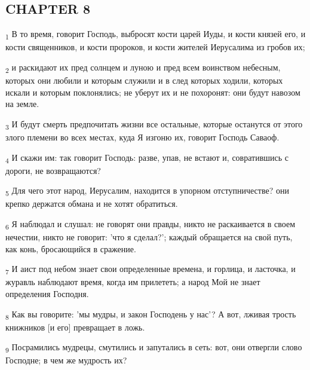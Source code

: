 \subsection{CHAPTER 8}
\begin{tcolorbox}
\textsubscript{1} В то время, говорит Господь, выбросят кости царей Иуды, и кости князей его, и кости священников, и кости пророков, и кости жителей Иерусалима из гробов их;
\end{tcolorbox}
\begin{tcolorbox}
\textsubscript{2} и раскидают их пред солнцем и луною и пред всем воинством небесным, которых они любили и которым служили и в след которых ходили, которых искали и которым поклонялись; не уберут их и не похоронят: они будут навозом на земле.
\end{tcolorbox}
\begin{tcolorbox}
\textsubscript{3} И будут смерть предпочитать жизни все остальные, которые останутся от этого злого племени во всех местах, куда Я изгоню их, говорит Господь Саваоф.
\end{tcolorbox}
\begin{tcolorbox}
\textsubscript{4} И скажи им: так говорит Господь: разве, упав, не встают и, совратившись с дороги, не возвращаются?
\end{tcolorbox}
\begin{tcolorbox}
\textsubscript{5} Для чего этот народ, Иерусалим, находится в упорном отступничестве? они крепко держатся обмана и не хотят обратиться.
\end{tcolorbox}
\begin{tcolorbox}
\textsubscript{6} Я наблюдал и слушал: не говорят они правды, никто не раскаивается в своем нечестии, никто не говорит: 'что я сделал?'; каждый обращается на свой путь, как конь, бросающийся в сражение.
\end{tcolorbox}
\begin{tcolorbox}
\textsubscript{7} И аист под небом знает свои определенные времена, и горлица, и ласточка, и журавль наблюдают время, когда им прилететь; а народ Мой не знает определения Господня.
\end{tcolorbox}
\begin{tcolorbox}
\textsubscript{8} Как вы говорите: 'мы мудры, и закон Господень у нас'? А вот, лживая трость книжников [и его] превращает в ложь.
\end{tcolorbox}
\begin{tcolorbox}
\textsubscript{9} Посрамились мудрецы, смутились и запутались в сеть: вот, они отвергли слово Господне; в чем же мудрость их?
\end{tcolorbox}
